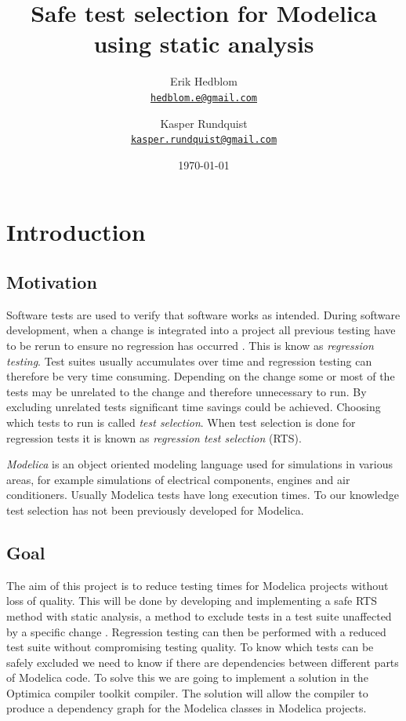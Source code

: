 \documentclass{cslthse-msc}
\author{
	Erik Hedblom \\
	{\normalsize \href{mailto:hedblom.e@gmail.com}{\texttt{hedblom.e@gmail.com}}}
	\and
	Kasper Rundquist \\
	{\normalsize \href{mailto:kasper.rundquist@gmail.com}{\texttt{kasper.rundquist@gmail.com}}}
}
\title{Safe test selection for Modelica using static analysis}
\date{\today}
\begin{document}
\makefrontmatter
\chapter[Introduction]{Introduction}

\section{Motivation}
Software tests are used to verify that software works as intended.
During software development, when a change is integrated into a project all previous testing have to be rerun to ensure no regression has occurred \cite{DBLP:conf/sigsoft/LegunsenHSLZM16, haider2016safe}. This is know as \emph{regression testing}. Test suites usually accumulates over time and regression testing can therefore be very time consuming. Depending on the change some or most of the tests may be unrelated to the change and therefore unnecessary to run. By excluding unrelated tests significant time savings could be achieved. Choosing which tests to run is called \emph{test selection}. When test selection is done for regression tests it is known as \emph{regression test selection} (RTS).

\emph{Modelica} is an object oriented modeling language used for simulations in various areas, for example simulations of electrical components, engines and air conditioners. Usually Modelica tests have long execution times. To our knowledge test selection has not been previously developed for Modelica.



\section{Goal}
The aim of this project is to reduce testing times for Modelica projects without loss of quality. This will be done by developing and implementing a safe RTS method with static analysis, a method to exclude tests in a test suite unaffected by a specific change \cite{DBLP:conf/pppj/OqvistHM16}. Regression testing can then be performed with a reduced test suite without compromising testing quality. To know which tests can be safely excluded we need to know if there are dependencies between different parts of Modelica code. To solve this we are going to implement a solution in the Optimica compiler toolkit compiler. The solution will allow the compiler to produce a dependency graph for the Modelica classes in Modelica projects.
\end{document}
